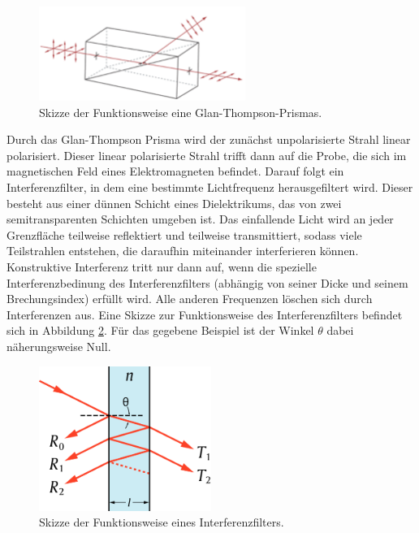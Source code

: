 \begin{figure}
  \centering
  \includegraphics[width=0.6\textwidth]{data/glanthompson.png}
  \caption{Skizze der Funktionsweise eine Glan-Thompson-Prismas. \cite{gt}}
  \label{fig:gt}
\end{figure}

Durch das Glan-Thompson Prisma wird der zunächst unpolarisierte Strahl linear
polarisiert. Dieser linear polarisierte Strahl trifft dann auf die Probe, die sich
im magnetischen Feld eines Elektromagneten befindet. Darauf folgt ein Interferenzfilter,
in dem eine bestimmte Lichtfrequenz herausgefiltert wird. Dieser besteht aus einer dünnen
Schicht eines Dielektrikums, das von zwei semitransparenten Schichten umgeben ist.
Das einfallende Licht wird an jeder Grenzfläche teilweise reflektiert und teilweise
transmittiert, sodass viele Teilstrahlen entstehen, die daraufhin miteinander
interferieren können. Konstruktive Interferenz tritt nur dann auf, wenn die spezielle
Interferenzbedinung des Interferenzfilters (abhängig von seiner Dicke und seinem Brechungsindex)
erfüllt wird. Alle anderen Frequenzen löschen sich durch Interferenzen aus. Eine Skizze
zur Funktionsweise des Interferenzfilters befindet sich in Abbildung \ref{fig:if}.
Für das gegebene Beispiel ist der Winkel $\theta$ dabei näherungsweise Null.

\begin{figure}
  \centering
  \includegraphics[width=0.5\textwidth]{data/if.png}
  \caption{Skizze der Funktionsweise eines Interferenzfilters. \cite{wiki2}}
  \label{fig:if}
\end{figure}

